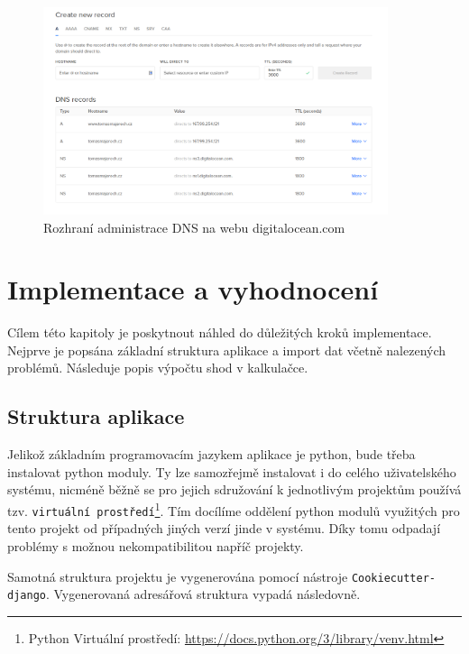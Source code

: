 \begin{figure}
    \centering
    \includegraphics[width=0.9\textwidth]{obrazky-figures/digitaloceanDNSadmin.png}
    \caption{Rozhraní administrace DNS na webu digitalocean.com}
    \label{fig:digitalocean-dns}
\end{figure}


\chapter{Implementace a vyhodnocení}
\label{chap:implementace}
Cílem této kapitoly je poskytnout náhled do důležitých kroků implementace. Nejprve je popsána základní struktura aplikace a import dat včetně nalezených problémů. Následuje popis výpočtu shod v kalkulačce.

\section{Struktura aplikace}
Jelikož základním programovacím jazykem aplikace je python, bude třeba instalovat python moduly. Ty lze samozřejmě instalovat i do celého uživatelského systému, nicméně běžně se pro jejich sdružování k jednotlivým projektům používá tzv. \texttt{virtuální prostředí}\footnote{Python Virtuální prostředí: \url{https://docs.python.org/3/library/venv.html}}. Tím docílíme oddělení python modulů využitých pro tento projekt od případných jiných verzí jinde v systému. Díky tomu odpadají problémy s možnou nekompatibilitou napříč projekty. 

\par Samotná struktura projektu je vygenerována pomocí nástroje \texttt{Cookiecutter-django}. Vygenerovaná adresářová struktura vypadá následovně.\\



\begin{minipage}[t]{.5\textwidth}
\end{minipage}
\begin{minipage}[t]{.5\textwidth}
\end{minipage}

